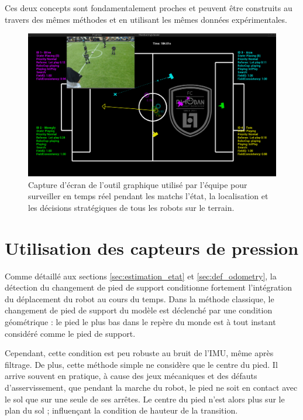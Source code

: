 Ces deux concepts sont fondamentalement proches et peuvent être 
construits au travers des mêmes méthodes et en utilisant les mêmes
données expérimentales.

\begin{figure}[htb]
    \begin{center}
        \includegraphics[width=1.0\linewidth]{../media/monitoring.png}
        \caption{\label{fig:monitoring} 
            Capture d'écran de l'outil graphique utilisé par l'équipe pour 
            surveiller en temps réel pendant les matchs l'état, la localisation 
            et les décisions stratégiques de tous les robots sur le terrain.
        }
    \end{center}
\end{figure}

\section{Utilisation des capteurs de pression\label{sec:odometry_pressure}}

Comme détaillé aux sections \ref{sec:estimation_etat} et \ref{sec:def_odometry},
la détection du changement de pied de support conditionne fortement
l'intégration du déplacement du robot au cours du temps.
Dans la méthode classique, le changement de pied de support
du modèle est déclenché par une condition géométrique : le pied le plus bas
dans le repère du monde est à tout instant considéré comme le pied de support.

Cependant, cette condition est peu robuste au bruit de l'IMU, même après filtrage.
De plus, cette méthode simple ne considère que le centre du pied. 
Il arrive souvent en pratique, à cause des jeux mécaniques et 
des défauts d'asservissement, que pendant la marche du robot, le pied
ne soit en contact avec le sol que sur une seule de ses arrêtes. 
Le centre du pied n'est alors plus sur le plan du sol ; influençant
la condition de hauteur de la transition.\\

